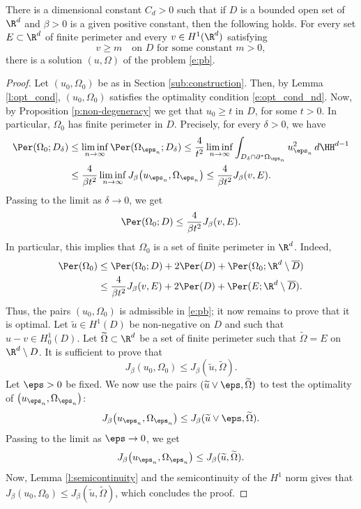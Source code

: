 \begin{prop}
There is a dimensional constant $C_d>0$ such that if $D$ is a bounded open set of $\R^d$ and $\beta>0$ is a given positive constant, then the following holds. For every set $E\subset\R^d$ of finite perimeter and every $v\in H^1(\R^d)$ satisfying
\[v\ge m\quad\text{on } D\text{ for some constant } m>0,\]
there is a solution $(u,\Omega)$ of the problem \eqref{e:pb}.
\end{prop}
\begin{proof}
Let $(u_0,\Omega_0)$ be as in Section \ref{sub:construction}. Then, by Lemma \ref{l:opt_cond}, $(u_0,\Omega_0)$ satisfies the optimality condition \eqref{e:opt_cond_nd}. Now, by Proposition \ref{p:non-degeneracy} we get that $u_0\ge t$ in $D$, for some $t>0$. In particular, $\Omega_0$ has finite perimeter in $D$. Precisely, for every $\delta>0$, we have
\begin{align*}
\Per(\Omega_0;D_\delta)&\le \liminf_{n\to\infty}\Per(\Omega_{\eps_n};D_\delta)\le \frac4{t^2}\liminf_{n\to\infty}\int_{D_\delta\cap\partial^\ast\Omega_{\eps_n}}u_{\eps_n}^2\,d\HH^{d-1}\\
&\le \frac4{\beta t^2}\liminf_{n\to\infty}J_\beta\big(u_{\eps_n},\Omega_{\eps_n}\big)\le \frac4{\beta t^2} J_\beta(v,E).
\end{align*}
Passing to the limit as $\delta\to0$, we get
\begin{align*}
\Per(\Omega_0;D)\le \frac4{\beta t^2} J_\beta(v,E).
\end{align*}
In particular, this implies that $\Omega_0$ is a set of finite perimeter in $\R^d$. Indeed,
\begin{align*}
\Per(\Omega_0)&\le \Per(\Omega_0;D)+2\Per(D)+\Per(\Omega_0;\R^d\setminus \overline D)\\
&\le \frac4{\beta t^2} J_\beta(v,E)+2\Per(D)+\Per(E;\R^d\setminus \overline D).
\end{align*}
Thus, the pairs $(u_0,\Omega_0)$ is admissible in \eqref{e:pb}; it now remains to prove that it is optimal. Let $\widetilde u\in H^1(D)$ be non-negative on $D$ and such that $u-v\in H^1_0(D)$. Let $\widetilde \Omega\subset\R^d$ be a set of finite perimeter such that $\widetilde \Omega=E$ on $\R^d\setminus D$. It is sufficient to prove that
\[J_\beta(u_0,\Omega_0)\le J_\beta(\widetilde u,\widetilde\Omega).\]
Let $\eps>0$ be fixed. We now use the pairs $(\widetilde u\vee \eps,\widetilde\Omega)$ to test the optimality of $\big(u_{\eps_n},\Omega_{\eps_n}\big)$:
\[J_\beta\big(u_{\eps_n},\Omega_{\eps_n}\big)\le J_\beta(\widetilde u\vee \eps,\widetilde\Omega).\]
Passing to the limit as $\eps\to0$, we get
\[J_\beta\big(u_{\eps_n},\Omega_{\eps_n}\big)\le J_\beta(\widetilde u,\widetilde\Omega).\]
Now, Lemma \ref{l:semicontinuity} and the semicontinuity of the $H^1$ norm gives that $J_\beta (u_0,\Omega_{0})\le J_\beta(\widetilde u,\widetilde\Omega)$,
which concludes the proof.
\end{proof}

